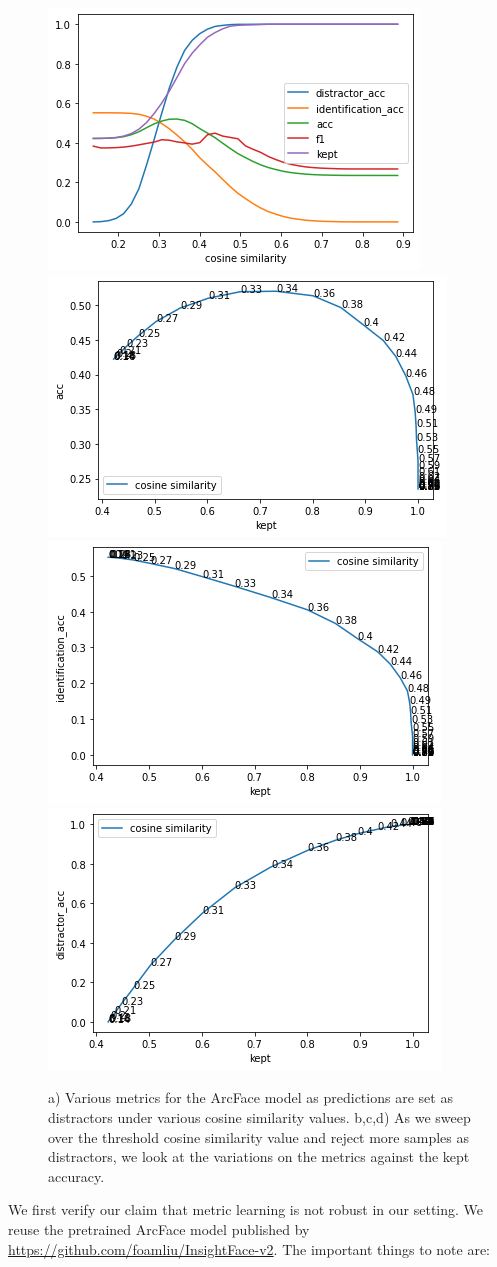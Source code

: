 \begin{figure}
    \centering
    \includegraphics[width=0.45\columnwidth]{50-files/arcface-all.png}
    \includegraphics[width=0.45\columnwidth]{50-files/arcface-acc-kept.png}
    \includegraphics[width=0.45\columnwidth]{50-files/arcface-id-kept.png}
    \includegraphics[width=0.45\columnwidth]{50-files/arcface-distr-kept.png}
    \caption{a) Various metrics for the ArcFace model as predictions are set as distractors under various cosine similarity values. b,c,d) As we sweep over the threshold cosine similarity value and reject more samples as distractors, we look at the variations on the metrics against the kept accuracy.}
    \label{fig:arcface-plots}
\end{figure}

We first verify our claim that metric learning is not robust in our setting. We reuse the pretrained ArcFace model published by \url{https://github.com/foamliu/InsightFace-v2}. The important things to note are:

